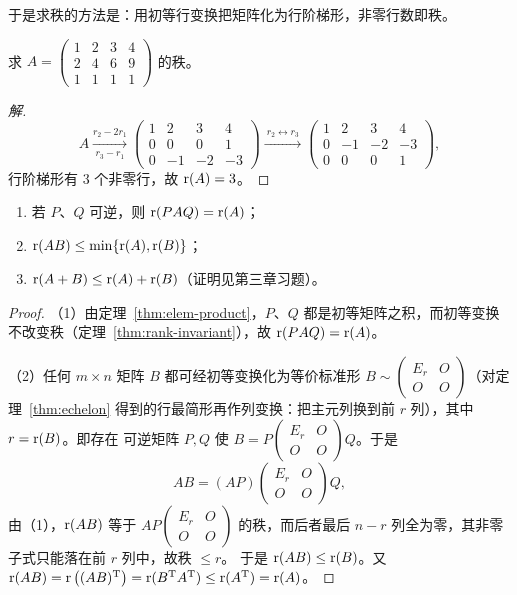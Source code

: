 于是求秩的方法是：用初等行变换把矩阵化为行阶梯形，非零行数即秩。

\begin{example}
求 $A=\begin{pmatrix} 1 & 2 & 3 & 4 \\ 2 & 4 & 6 & 9 \\ 1 & 1 & 1 & 1 \end{pmatrix}$
的秩。
\end{example}
\begin{proof}[解]
\[
  A\xrightarrow[\ r_3-r_1\ ]{r_2-2r_1}
  \begin{pmatrix} 1 & 2 & 3 & 4 \\ 0 & 0 & 0 & 1 \\ 0 & -1 & -2 & -3 \end{pmatrix}
  \xrightarrow{\ r_2\leftrightarrow r_3\ }
  \begin{pmatrix} 1 & 2 & 3 & 4 \\ 0 & -1 & -2 & -3 \\ 0 & 0 & 0 & 1 \end{pmatrix},
\]
行阶梯形有 $3$ 个非零行，故 $\operatorname{r}(A)=3$。
\end{proof}

\begin{theorem}\label{thm:rank-product}
\begin{enumerate}[label=(\arabic*), itemsep=0pt]
  \item 若 $P$、$Q$ 可逆，则 $\operatorname{r}(PAQ)=\operatorname{r}(A)$；
  \item $\operatorname{r}(AB)\le\min\{\operatorname{r}(A),\operatorname{r}(B)\}$；
  \item $\operatorname{r}(A+B)\le\operatorname{r}(A)+\operatorname{r}(B)$（证明见第三章习题）。
\end{enumerate}
\end{theorem}
\begin{proof}
（1）由定理~\ref{thm:elem-product}，$P$、$Q$ 都是初等矩阵之积，而初等变换
不改变秩（定理~\ref{thm:rank-invariant}），故 $\operatorname{r}(PAQ)=\operatorname{r}(A)$。

（2）任何 $m\times n$ 矩阵 $B$ 都可经初等变换化为等价标准形
$B\sim\begin{pmatrix} E_r & O \\ O & O \end{pmatrix}$（对定理~\ref{thm:echelon}
得到的行最简形再作列变换：把主元列换到前 $r$ 列），其中 $r=\operatorname{r}(B)$。即存在
可逆矩阵 $P,Q$ 使 $B=P\begin{pmatrix} E_r & O \\ O & O \end{pmatrix}Q$。于是
\[
  AB=(AP)\begin{pmatrix} E_r & O \\ O & O \end{pmatrix}Q,
\]
由（1），$\operatorname{r}(AB)$ 等于 $AP\begin{pmatrix} E_r & O \\ O & O \end{pmatrix}$
的秩，而后者最后 $n-r$ 列全为零，其非零子式只能落在前 $r$ 列中，故秩 $\le r$。
于是 $\operatorname{r}(AB)\le\operatorname{r}(B)$。又
$\operatorname{r}(AB)=\operatorname{r}\big((AB)^{\mathrm{T}}\big)=\operatorname{r}(B^{\mathrm{T}} A^{\mathrm{T}})\le\operatorname{r}(A^{\mathrm{T}})=\operatorname{r}(A)$。
\end{proof}

